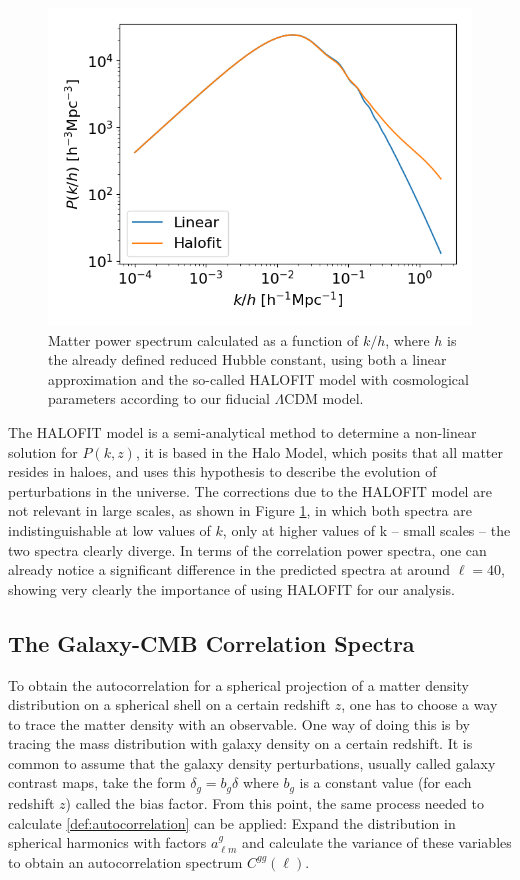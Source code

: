 \documentclass[openany,a4paper,12pt,oneside]{book}
\begin{document}
\begin{spacing}{1.5}
\begin{figure}[!htb]
    \centering
    \includegraphics[width=.75\linewidth]{Imagens/Pk_3dmatter_LCDM.png}
    \caption{Matter power spectrum calculated as a function of $k/h$, where $h$ is the already defined reduced Hubble constant, using both a linear approximation and the so-called HALOFIT model\cite{Halofit2020} with cosmological parameters according to our fiducial $\Lambda$CDM model.}
    \label{fig:matter_PS}
\end{figure}

The HALOFIT model is a semi-analytical method to determine a non-linear solution for $P(k,z)$, it is based in the Halo Model, which posits that all matter resides in haloes, and uses this hypothesis to describe the evolution of perturbations in the universe. The corrections due to the HALOFIT model are not relevant in large scales, as shown in Figure \ref{fig:matter_PS}, in which both spectra are indistinguishable at low values of $k$, only at higher values of k -- small scales -- the two spectra clearly diverge. In terms of the correlation power spectra, one can already notice a significant difference in the predicted spectra at around $\ell=40$\cite{Moura-Santos_2016}, showing very clearly the importance of using HALOFIT for our analysis.

\subsection{The Galaxy-CMB Correlation Spectra}\label{ch2:correlations}

To obtain the autocorrelation for a spherical projection of a matter density distribution on a spherical shell on a certain redshift $z$, one has to choose a way to trace the matter density with an observable. One way of doing this is by tracing the mass distribution with galaxy density on a certain redshift. It is common to assume that the galaxy density perturbations, usually called galaxy contrast maps, take the form $\delta_g=b_g\delta$ where $b_g$ is a constant value (for each redshift $z$) called the bias factor. From this point, the same process needed to calculate \eqref{def:autocorrelation} can be applied: Expand the distribution in spherical harmonics with factors $a_{\ell m}^g$ and calculate the variance of these variables to obtain an autocorrelation spectrum $C^{gg}(\ell)$.


\end{spacing}
\end{document}
